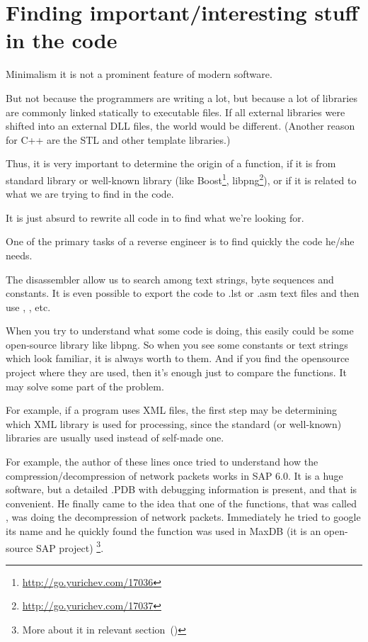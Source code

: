 \chapter{Finding important/interesting stuff in the code}

Minimalism it is not a prominent feature of modern software.


But not because the programmers are writing a lot, but because a lot of libraries are commonly linked statically
to executable files.
If all external libraries were shifted into an external DLL files, the world would be different.
(Another reason for C++ are the \ac{STL} and other template libraries.)

\newcommand{\FOOTNOTEBOOST}{\footnote{\url{http://go.yurichev.com/17036}}}
\newcommand{\FOOTNOTELIBPNG}{\footnote{\url{http://go.yurichev.com/17037}}}

Thus, it is very important to determine the origin of a function, if it is from standard library or 
well-known library (like Boost\FOOTNOTEBOOST, libpng\FOOTNOTELIBPNG),
or if it is related to what we are trying to find in the code.

It is just absurd to rewrite all code in \CCpp to find what we're looking for.

One of the primary tasks of a reverse engineer is to find quickly the code he/she needs.

\myindex{\GrepUsage}

The \IDA disassembler allow us to search among text strings, byte sequences and constants.
It is even possible to export the code to .lst or .asm text files and then use , , etc.

When you try to understand what some code is doing, this easily could be some open-source library like libpng.
So when you see some constants or text strings which look familiar, it is always worth to  them.
And if you find the opensource project where they are used, 
then it's enough just to compare the functions.
It may solve some part of the problem.

For example, if a program uses XML files, the first step may be determining which
XML library is used for processing, since the standard (or well-known) libraries are usually used
instead of self-made one.


For example, the author of these lines once tried to understand how the compression/decompression of network packets works in SAP 6.0. 
It is a huge software, but a detailed .\gls{PDB} with debugging information is present, 
and that is convenient.
He finally came to the idea that one of the functions, that was called , was doing the decompression of network packets.
Immediately he tried to google its name and he quickly found the function was used in MaxDB
(it is an open-source SAP project) \footnote{More about it in relevant section~()}.


